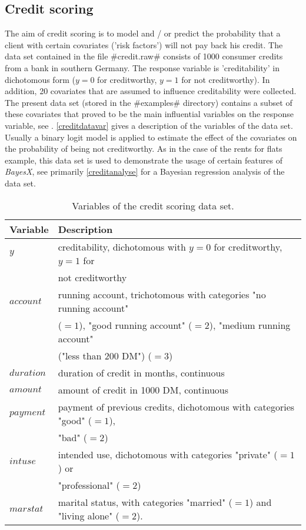 \subsection{Credit scoring}
\label{creditdata}  

The aim of credit scoring is to model and / or predict the probability that a client with certain covariates ('risk factors')
will not pay back his credit. The data set contained in the file #credit.raw# consists of 1000 consumer credits from a bank in
southern Germany. The response variable is 'creditability' in dichotomous form ($y=0$ for creditworthy, $y=1$ for not
creditworthy). In addition, 20 covariates that are assumed to influence creditability were collected. The present data set
(stored in the #examples# directory) contains a subset of these covariates that proved to be the main influential variables on
the response variable, see . \autoref{creditdatavar} gives a description of the variables of the
data set. Usually a binary logit model is applied to estimate the effect of the covariates on the probability of being not
creditworthy. As in the case of the rents for flats example, this data set is used to demonstrate the usage of certain features
of {\em BayesX}, see primarily \autoref{creditanalyse} for a Bayesian regression analysis of the data set.

\begin{table}[ht]

\begin{tabular}{|l|l|}
\hline
{\bf Variable} & {\bf Description} \\
\hline
$y$ & creditability, dichotomous with $y=0$ for creditworthy, $y=1$ for \\
    & not creditworthy \\
$account$ & running account, trichotomous with categories "no
running account" \\& ($=1$),
    "good running account"
($=2$),  "medium running account" \\&("less than 200 DM") ($=3$)  \\
$duration$ & duration of credit in months, continuous \\
$amount$ & amount of credit in 1000 DM, continuous \\
$payment$ & payment of previous credits, dichotomous with categories "good" ($=1$), \\ & "bad" ($=2$)  \\
$intuse$ & intended use, dichotomous with categories "private" ($=1$) or \\ & "professional" ($=2$)  \\
$marstat$ & marital status, with categories "married" ($=1$) and "living alone" ($=2$). \\
\hline
\end{tabular}
{\em \caption{\label{creditdatavar}Variables of the credit scoring
data set.}}
\end{table}

